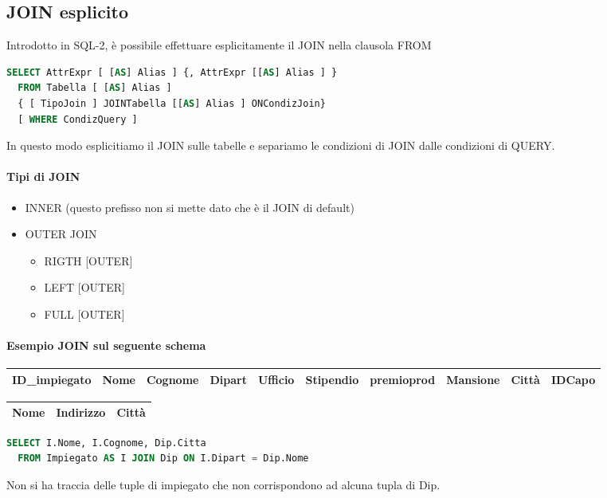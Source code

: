 \subsection{JOIN esplicito}
Introdotto in SQL-2, è possibile effettuare esplicitamente il JOIN
nella clausola FROM
\begin{lstlisting}[language=SQL]
  SELECT AttrExpr [ [AS] Alias ] {, AttrExpr [[AS] Alias ] }
  FROM Tabella [ [AS] Alias ]
  { [ TipoJoin ] JOINTabella [[AS] Alias ] ONCondizJoin}
  [ WHERE CondizQuery ]
\end{lstlisting}
In questo modo esplicitiamo il JOIN sulle tabelle e separiamo
le condizioni di JOIN dalle condizioni di QUERY.
\paragraph*{Tipi di JOIN}
\begin{itemize}
  \item INNER (questo prefisso non si mette dato che è il JOIN di default)
  \item OUTER JOIN
  \begin{itemize}
    \item RIGTH [OUTER]
    \item LEFT [OUTER]
    \item FULL [OUTER]
  \end{itemize}
\end{itemize}
\paragraph*{Esempio JOIN sul seguente schema}
\begin{center}
  \begin{tabular}{|c|c|c|c|c|c|c|c|c|c|}
    \hline
    ID\_impiegato & Nome & Cognome & Dipart & Ufficio & Stipendio & premioprod & Mansione & Città & IDCapo \\
    \hline
  \end{tabular}
\end{center}
\begin{tabular}{|c|c|c|}
  \hline
  Nome & Indirizzo & Città\\
  \hline
\end{tabular}
\begin{lstlisting}[language=SQL]
  SELECT I.Nome, I.Cognome, Dip.Citta
  FROM Impiegato AS I JOIN Dip ON I.Dipart = Dip.Nome
\end{lstlisting}
Non si ha traccia delle tuple di impiegato che non corrispondono
ad alcuna tupla di Dip.
